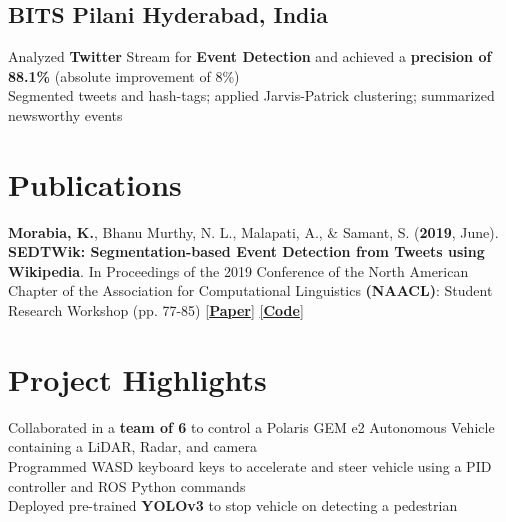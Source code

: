 \documentclass[]{Resume}
\begin{document}
\subsection{BITS Pilani \hfill \normalfont Hyderabad, India}
\pt Analyzed \textbf{Twitter} Stream for \textbf{Event Detection} and achieved a \textbf{precision of 88.1\%} (absolute improvement of 8\%) \\
\pt Segmented tweets and hash-tags; applied Jarvis-Patrick clustering; summarized newsworthy events 
\sectionsep

\section{Publications} 
\hrulefill 

\textbf{Morabia, K.}, Bhanu Murthy, N. L., Malapati, A., \& Samant, S. (\textbf{2019}, June). \textbf{SEDTWik: Segmentation-based Event Detection from Tweets using Wikipedia}. In Proceedings of the 2019 Conference of the North American Chapter of the Association for Computational Linguistics \textbf{(NAACL)}: Student Research Workshop (pp. 77-85) \href{https://www.aclweb.org/anthology/N19-3011/}{[\textbf{Paper}]} \href{https://github.com/kevalmorabia97/SEDTWik-Event-Detection-from-Tweets}{[\textbf{Code}]}
\sectionsep

\section{Project Highlights}
\hrulefill


\pt Collaborated in a \textbf{team of 6} to control a Polaris GEM e2 Autonomous Vehicle containing a LiDAR, Radar, and camera \\
\pt Programmed WASD keyboard keys to accelerate and steer vehicle using a PID controller and ROS Python commands \\
\pt Deployed pre-trained \textbf{YOLOv3} to stop vehicle on detecting a pedestrian
\sectionsep
\end{document}
